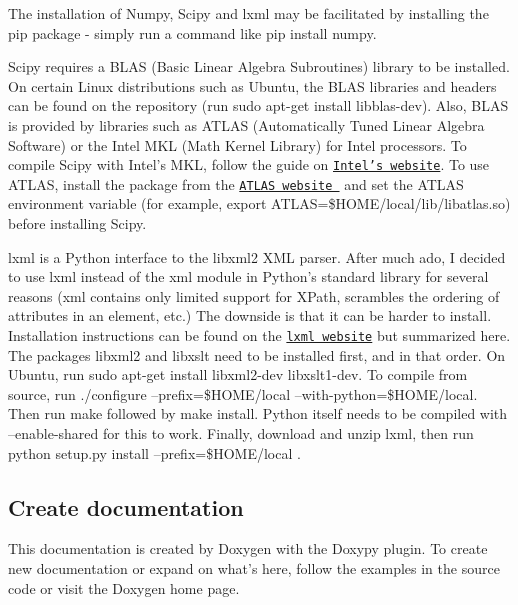 \begin{DoxyItemize}
\item The installation of Numpy, Scipy and lxml may be facilitated by installing the {\ttfamily pip} package -\/ simply run a command like {\ttfamily pip install numpy}. \item Scipy requires a B\-L\-A\-S (Basic Linear Algebra Subroutines) library to be installed. On certain Linux distributions such as Ubuntu, the B\-L\-A\-S libraries and headers can be found on the repository (run {\ttfamily sudo apt-\/get install libblas-\/dev}). Also, B\-L\-A\-S is provided by libraries such as A\-T\-L\-A\-S (Automatically Tuned Linear Algebra Software) or the Intel M\-K\-L (Math Kernel Library) for Intel processors. To compile Scipy with Intel's M\-K\-L, follow the guide on \href{http://software.intel.com/en-us/articles/numpy-scipy-with-mkl}{\tt Intel's website}. To use A\-T\-L\-A\-S, install the package from the \href{http://math-atlas.sourceforge.net}{\tt A\-T\-L\-A\-S website } and set the A\-T\-L\-A\-S environment variable (for example, {\ttfamily export A\-T\-L\-A\-S=\$\-H\-O\-M\-E/local/lib/libatlas.so}) before installing Scipy. \item {\ttfamily lxml} is a Python interface to the libxml2 X\-M\-L parser. After much ado, I decided to use {\ttfamily lxml} instead of the {\ttfamily xml} module in Python's standard library for several reasons ({\ttfamily xml} contains only limited support for X\-Path, scrambles the ordering of attributes in an element, etc.) The downside is that it can be harder to install. Installation instructions can be found on the \href{http://lxml.de/installation.html}{\tt lxml website} but summarized here. The packages {\ttfamily libxml2} and {\ttfamily libxslt} need to be installed first, and in that order. On Ubuntu, run {\ttfamily sudo apt-\/get install libxml2-\/dev libxslt1-\/dev}. To compile from source, run {\ttfamily ./configure --prefix=\$\-H\-O\-M\-E/local --with-\/python=\$\-H\-O\-M\-E/local}. Then run {\ttfamily make} followed by {\ttfamily make install}. Python itself needs to be compiled with {\ttfamily --enable-\/shared} for this to work. Finally, download and unzip {\ttfamily lxml}, then run {\ttfamily  python setup.\-py install --prefix=\$\-H\-O\-M\-E/local }.\end{DoxyItemize}
\hypertarget{installation_create_doc}{}\subsection{Create documentation}\label{installation_create_doc}
This documentation is created by Doxygen with the Doxypy plugin. To create new documentation or expand on what's here, follow the examples in the source code or visit the Doxygen home page.

